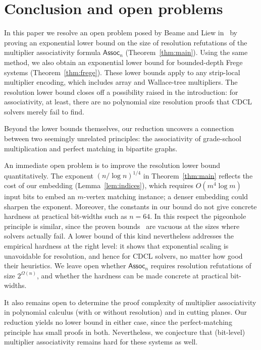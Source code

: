 \documentclass[11pt]{article}
\theoremstyle{definition}
\theoremstyle{remark}
\newcommand{\Assoc}{\mathsf{Assoc}}
\begin{document}
\section{Conclusion and open problems}
\label{sec:conclusion}

In this paper we resolve an open problem posed by Beame and Liew in~\cite{beame-liew} by proving an exponential lower bound on the size of resolution refutations of the multiplier associativity formula $\Assoc_n$ (Theorem~\ref{thm:main}). Using the same method, we also obtain an exponential lower bound for bounded-depth Frege systems (Theorem~\ref{thm:frege}). These lower bounds apply to any strip-local multiplier encoding, which includes array and Wallace-tree multipliers. The resolution lower bound closes off a possibility raised in the introduction: for associativity, at least, there are no polynomial size resolution proofs that CDCL solvers merely fail to find.

Beyond the lower bounds themselves, our reduction uncovers a connection between two seemingly unrelated principles: the associativity of grade-school multiplication and perfect matching in bipartite graphs.

An immediate open problem is to improve the resolution lower bound quantitatively. The
exponent $(n/\log n)^{1/4}$ in Theorem~\ref{thm:main}
reflects the cost of our embedding (Lemma~\ref{lem:indices}), which requires $O(m^4 \log m)$ input
bits to embed an $m$-vertex matching instance; a denser embedding could sharpen
the exponent. Moreover, the constants in our bound do not give concrete hardness at practical bit-widths such as $n = 64$. In this respect the pigeonhole principle is similar, since the proven bounds~\cite{haken,beame-pitassi} are vacuous at the sizes where solvers actually fail. A lower bound of this kind nevertheless addresses the empirical hardness at the right level: it shows that exponential scaling is unavoidable for resolution, and hence for CDCL solvers, no matter how good their heuristics. We leave
open whether $\Assoc_n$ requires resolution refutations of size
$2^{\Omega(n)}$, and whether the hardness can be made concrete at practical bit-widths.

It also remains open to determine the proof complexity of multiplier associativity in polynomial calculus (with or without resolution) and in cutting planes. Our reduction yields no lower bound in either case, since the perfect-matching principle has small proofs in both. Nevertheless, we conjecture that (bit-level) multiplier associativity remains hard for these systems as well.
\end{document}
